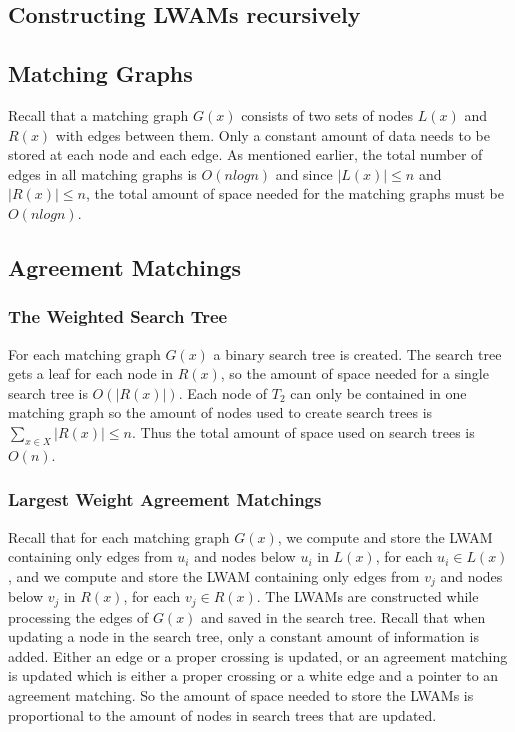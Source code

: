\subsection{Constructing LWAMs recursively}

\subsection{Matching Graphs}
Recall that a matching graph $G(x)$ consists of two sets of nodes $L(x)$ and $R(x)$ with edges between them. Only a constant amount of data needs to be stored at each node and each edge. As mentioned earlier, the total number of edges in all matching graphs is $O(nlogn)$ and since $|L(x)| \le n$ and $|R(x)| \le n$, the total amount of space needed for the matching graphs must be $O(nlogn)$.

\subsection{Agreement Matchings}
\subsubsection{The Weighted Search Tree}
For each matching graph $G(x)$ a binary search tree is created. The search tree gets a leaf for each node in $R(x)$, so the amount of space needed for a single search tree is $O(|R(x)|)$. Each node of $T_2$ can only be contained in one matching graph so the amount of nodes used to create search trees is $\sum_{x \in X} |R(x)| \le n$. Thus the total amount of space used on search trees is $O(n)$.

\subsubsection{Largest Weight Agreement Matchings}
Recall that for each matching graph $G(x)$, we compute and store the LWAM containing only edges from $u_i$ and nodes below $u_i$ in $L(x)$, for each $u_i \in L(x)$, and we compute and store the LWAM containing only edges from $v_j$ and nodes below $v_j$ in $R(x)$, for each $v_j \in R(x)$. The LWAMs are constructed while processing the edges of $G(x)$ and saved in the search tree. Recall that when updating a node in the search tree, only a constant amount of information is added. Either an edge or a proper crossing is updated, or an agreement matching is updated which is either a proper crossing or a white edge and a pointer to an agreement matching. So the amount of space needed to store the LWAMs is proportional to the amount of nodes in search trees that are updated.

